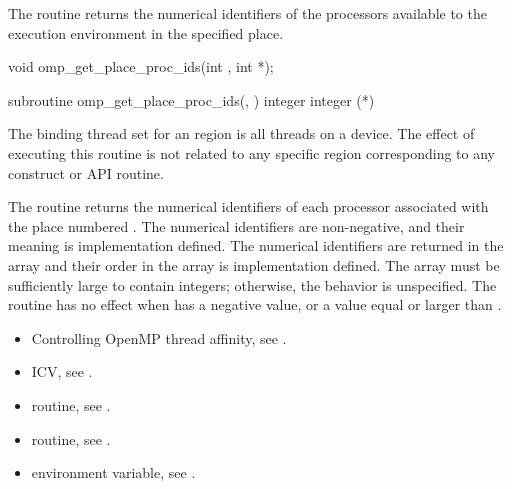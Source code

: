 \summary
The  routine returns the numerical identifiers of the processors available to the execution environment in the specified place.

\format
\begin{ccppspecific}
\begin{ompcFunction}
void omp_get_place_proc_ids(int , int *);
\end{ompcFunction}
\end{ccppspecific}

\begin{fortranspecific}
\begin{ompfSubroutine}
subroutine omp_get_place_proc_ids(, )
integer 
integer (*)
\end{ompfSubroutine}
\end{fortranspecific}

\binding
The binding thread set for an  region is all
threads on a device. The effect of executing this routine is not related to
any specific region corresponding to any construct or API routine.

\effect
The  routine returns the numerical
identifiers of each processor associated with the place numbered
. The numerical identifiers are non-negative, and
their meaning is implementation defined.  The numerical identifiers
are returned in the array  and their order in the array is
implementation defined. The array must be sufficiently large to contain
\code{)} integers;
otherwise, the behavior is unspecified.  The routine has no effect when
 has a negative value, or a value equal or larger
than .

\crossreferences
\begin{itemize}

\item Controlling OpenMP thread affinity, see
.

\item {} ICV, see
.

\item {} routine, see
.

\item {} routine, see
.

\item {} environment variable, see
.
\end{itemize}




